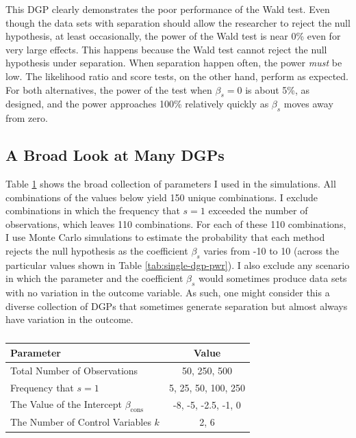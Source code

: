 \documentclass[
]{article}
\begin{document}
This DGP clearly demonstrates the poor performance of the Wald test.
Even though the data sets with separation should allow the researcher to
reject the null hypothesis, at least occasionally, the power of the Wald
test is near 0\% even for very large effects. This happens because the
Wald test cannot reject the null hypothesis under separation. When
separation happen often, the power \emph{must} be low. The likelihood
ratio and score tests, on the other hand, perform as expected. For both
alternatives, the power of the test when \(\beta_s = 0\) is about 5\%,
as designed, and the power approaches 100\% relatively quickly as
\(\beta_s\) moves away from zero.

\hypertarget{a-broad-look-at-many-dgps}{%
\subsection{A Broad Look at Many DGPs}\label{a-broad-look-at-many-dgps}}

Table \ref{tab:many-dgps-pars} shows the broad collection of parameters
I used in the simulations. All combinations of the values below yield
150 unique combinations. I exclude combinations in which the frequency
that \(s = 1\) exceeded the number of observations, which leaves 110
combinations. For each of these 110 combinations, I use Monte Carlo
simulations to estimate the probability that each method rejects the
null hypothesis as the coefficient \(\beta_s\) varies from -10 to 10
(across the particular values shown in Table \ref{tab:single-dgp-pwr}).
I also exclude any scenario in which the parameter and the coefficient
\(\beta_s\) would sometimes produce data sets with no variation in the
outcome variable. As such, one might consider this a diverse collection
of DGPs that sometimes generate separation but almost always have
variation in the outcome.

\renewcommand{\captiontext}{}
\renewcommand{\notetext}{}
\begin{table}[!h]
\caption{\label{tab:many-dgps-pars}}
\centering
\fontsize{10}{12}\selectfont
\begin{threeparttable}
\begin{tabular}{lc}
\toprule
Parameter & Value        \\
\midrule
Total Number of Observations & 50, 250, 500 \\
Frequency that $s = 1$    &   5, 25, 50, 100, 250 \\
The Value of the Intercept $\beta_{\text{cons}}$ & -8, -5, -2.5, -1, 0 \\
The Number of Control Variables $k$ & 2, 6 \\
\bottomrule
\end{tabular}\begin{tablenotes}[para]

\end{tablenotes}
\end{threeparttable}
\end{table}
\end{document}
